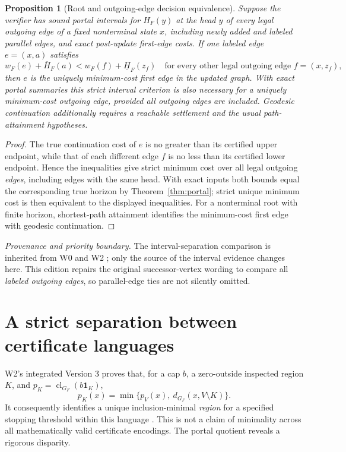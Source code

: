 \documentclass[11pt,letterpaper]{article}
\newtheorem{proposition}[theorem]{Proposition}
\newcommand{\attrib}[1]{\par\noindent\textit{Provenance and priority boundary.} #1\par}
\begin{document}
\begin{proposition}[Root and outgoing-edge decision equivalence]\label{prop:actions}
Suppose the verifier has sound portal intervals for $H_F(y)$ at the head $y$ of \emph{every legal outgoing edge} of a fixed nonterminal state $x$, including newly added and labeled parallel edges, and exact post-update first-edge costs. If one labeled edge $e=(x,a)$ satisfies
\[
 w_F(e)+\overline H_F(a)<w_F(f)+\underline H_F(z_f)
 \quad\text{for every other legal outgoing edge }f=(x,z_f),
\]
then $e$ is the uniquely minimum-cost first edge in the updated graph. With exact portal summaries this strict interval criterion is also necessary for a uniquely minimum-cost outgoing edge, provided all outgoing edges are included. Geodesic continuation additionally requires a reachable settlement and the usual path-attainment hypotheses.
\end{proposition}
\begin{proof}
The true continuation cost of $e$ is no greater than its certified upper endpoint, while that of each different edge $f$ is no less than its certified lower endpoint. Hence the inequalities give strict minimum cost over all legal outgoing \emph{edges}, including edges with the same head. With exact inputs both bounds equal the corresponding true horizon by Theorem~\ref{thm:portal}; strict unique minimum cost is then equivalent to the displayed inequalities. For a nonterminal root with finite horizon, shortest-path attainment identifies the minimum-cost first edge with geodesic continuation.
\end{proof}
\attrib{The interval-separation comparison is inherited from W0 and W2 \cite{W0,W2,Hart,Mugdan}; only the source of the interval evidence changes here. This edition repairs the original successor-vertex wording to compare all \emph{labeled outgoing edges}, so parallel-edge ties are not silently omitted.}

\section{A strict separation between certificate languages}
W2's integrated Version 3 proves that, for a cap $b$, a zero-outside inspected region $K$, and $p_K=\operatorname{cl}_{G_F}(b\mathbf1_K)$,
\begin{equation}\label{eq:w2}
p_K(x)=\min\bigl\{p_V(x),\ d_{G_F}(x,V\setminus K)\bigr\}.
\end{equation}
It consequently identifies a unique inclusion-minimal \emph{region} for a specified stopping threshold within this language \cite[Theorems 5.2 and 6.4]{W2}. This is not a claim of minimality across all mathematically valid certificate encodings. The portal quotient reveals a rigorous disparity.
\end{document}
